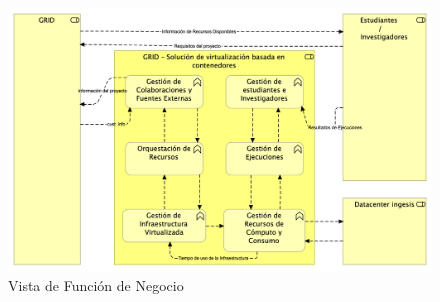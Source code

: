\begin{figure}[H]
    \centering
    \includegraphics[width=\textwidth]{tablas-images/cp6/Business-Function-View.png}
    \caption{Vista de Función de Negocio}\label{fig:vista-funcion-negocio}
\end{figure}